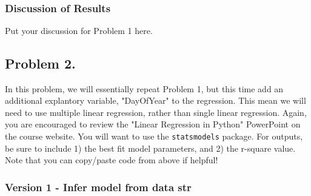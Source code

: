 \documentclass[11pt]{article}
\begin{document}
    \begin{center}
    \end{center}
    { \hspace*{\fill} \\}
    
    \subsubsection{Discussion of Results}\label{discussion-of-results}

Put your discussion for Problem 1 here.

    \subsection{Problem 2.}\label{problem-2.}

In this problem, we will essentially repeat Problem 1, but this time add
an additional explantory variable, "DayOfYear" to the regression. This
mean we will need to use multiple linear regression, rather than single
linear regression. Again, you are encouraged to review the "Linear
Regression in Python" PowerPoint on the course website. You will want to
use the \texttt{statsmodels} package. For outputs, be sure to include 1)
the best fit model parameters, and 2) the r-square value. Note that you
can copy/paste code from above if helpful!

    \subsubsection{Version 1 - Infer model from data
str}\label{version-1---infer-model-from-data-str}
\end{document}
